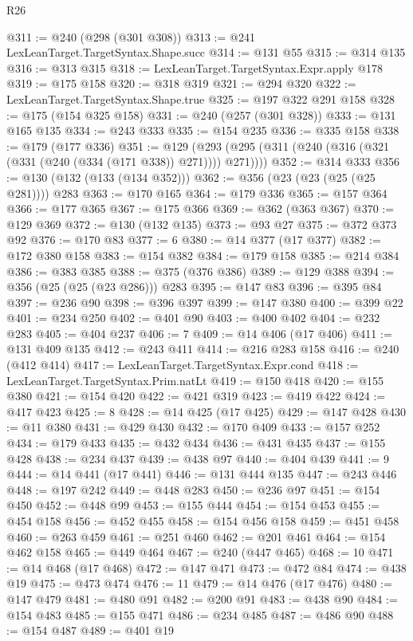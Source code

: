 \begin{lexlean}{R26}
\begin{coremodule}
@311 := @240 (@298 (@301 @308))
@313 := @241 LexLeanTarget.TargetSyntax.Shape.succ
@314 := @131 @55
@315 := @314 @135
@316 := @313 @315
@318 := LexLeanTarget.TargetSyntax.Expr.apply @178
@319 := @175 @158
@320 := @318 @319
@321 := @294 @320
@322 := LexLeanTarget.TargetSyntax.Shape.true
@325 := @197 @322 @291 @158
@328 := @175 (@154 @325 @158)
@331 := @240 (@257 (@301 @328))
@333 := @131 @165 @135
@334 := @243 @333
@335 := @154 @235
@336 := @335 @158
@338 := @179 (@177 @336)
@351 := @129 (@293 (@295 (@311 (@240 (@316 (@321 (@331 (@240 (@334 (@171 @338)) @271)))) @271))))
@352 := @314 @333
@356 := @130 (@132 (@133 (@134 @352)))
@362 := @356 (@23 (@23 (@25 (@25 @281)))) @283
@363 := @170 @165
@364 := @179 @336
@365 := @157 @364
@366 := @177 @365
@367 := @175 @366
@369 := @362 (@363 @367)
@370 := @129 @369
@372 := @130 (@132 @135)
@373 := @93 @27
@375 := @372 @373 @92
@376 := @170 @83
@377 := 6
@380 := @14 @377 (@17 @377)
@382 := @172 @380 @158
@383 := @154 @382
@384 := @179 @158
@385 := @214 @384
@386 := @383 @385
@388 := @375 (@376 @386)
@389 := @129 @388
@394 := @356 (@25 (@25 (@23 @286))) @283
@395 := @147 @83
@396 := @395 @84
@397 := @236 @90
@398 := @396 @397
@399 := @147 @380
@400 := @399 @22
@401 := @234 @250
@402 := @401 @90
@403 := @400 @402
@404 := @232 @283
@405 := @404 @237
@406 := 7
@409 := @14 @406 (@17 @406)
@411 := @131 @409 @135
@412 := @243 @411
@414 := @216 @283 @158
@416 := @240 (@412 @414)
@417 := LexLeanTarget.TargetSyntax.Expr.cond
@418 := LexLeanTarget.TargetSyntax.Prim.natLt
@419 := @150 @418
@420 := @155 @380
@421 := @154 @420
@422 := @421 @319
@423 := @419 @422
@424 := @417 @423
@425 := 8
@428 := @14 @425 (@17 @425)
@429 := @147 @428
@430 := @11 @380
@431 := @429 @430
@432 := @170 @409
@433 := @157 @252
@434 := @179 @433
@435 := @432 @434
@436 := @431 @435
@437 := @155 @428
@438 := @234 @437
@439 := @438 @97
@440 := @404 @439
@441 := 9
@444 := @14 @441 (@17 @441)
@446 := @131 @444 @135
@447 := @243 @446
@448 := @197 @242
@449 := @448 @283
@450 := @236 @97
@451 := @154 @450
@452 := @448 @99
@453 := @155 @444
@454 := @154 @453
@455 := @454 @158
@456 := @452 @455
@458 := @154 @456 @158
@459 := @451 @458
@460 := @263 @459
@461 := @251 @460
@462 := @201 @461
@464 := @154 @462 @158
@465 := @449 @464
@467 := @240 (@447 @465)
@468 := 10
@471 := @14 @468 (@17 @468)
@472 := @147 @471
@473 := @472 @84
@474 := @438 @19
@475 := @473 @474
@476 := 11
@479 := @14 @476 (@17 @476)
@480 := @147 @479
@481 := @480 @91
@482 := @200 @91
@483 := @438 @90
@484 := @154 @483
@485 := @155 @471
@486 := @234 @485
@487 := @486 @90
@488 := @154 @487
@489 := @401 @19

\end{coremodule}
\end{lexlean}
